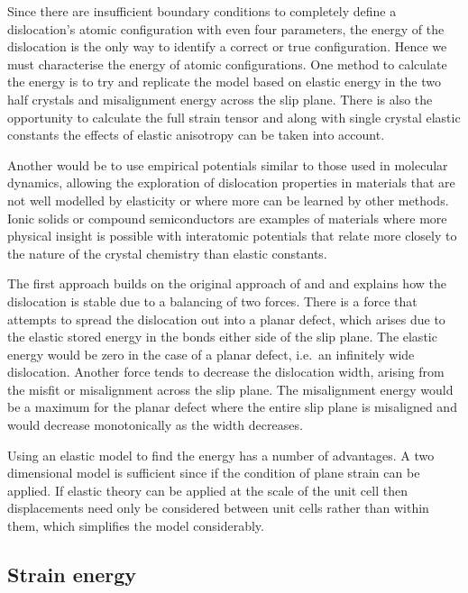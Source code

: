 

Since there are insufficient boundary conditions to completely define a dislocation's atomic configuration with even four parameters, the energy of the dislocation is the only way to identify a correct or true configuration. Hence we must characterise the energy of atomic configurations. One method to calculate the energy is to try and replicate the model based on elastic energy in the two half crystals and misalignment energy across the slip plane. There is also the opportunity to calculate the full strain tensor and along with single crystal elastic constants the effects of elastic anisotropy can be taken into account. 

Another would be to use empirical potentials similar to those used in molecular dynamics, allowing the exploration of dislocation properties in materials that are not well modelled by elasticity or where more can be learned by other methods. Ionic solids or compound semiconductors are examples of materials where more physical insight is possible with interatomic potentials that relate more closely to the nature of the crystal chemistry than elastic constants. 



The first approach builds on the original approach of \citet{Peierls1940} and \citet{Nabarro1947} and explains how the dislocation is stable due to a balancing of two forces. There is a force that attempts to spread the dislocation out into a planar defect, which arises due to the elastic stored energy in the bonds either side of the slip plane. The elastic energy would be zero in the case of a planar defect, i.e.\ an infinitely wide dislocation. Another force tends to decrease the dislocation width, arising from the misfit or misalignment across the slip plane. The misalignment energy would be a maximum for the planar defect where the entire slip plane is misaligned and would decrease monotonically as the width decreases.

Using an elastic model to find the energy has a number of advantages. A two dimensional model is sufficient since if the  condition of plane strain can be applied. If elastic theory can be applied at the scale of the unit cell then displacements need only be considered between unit cells rather than within them, which simplifies the model considerably.

\subsection{Strain energy}

